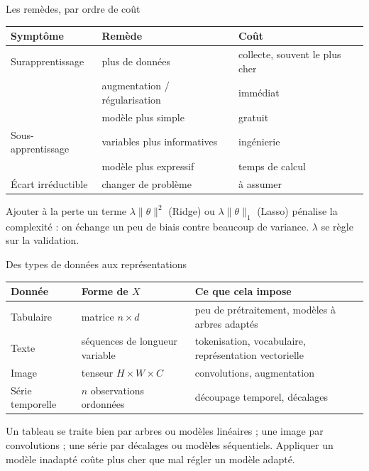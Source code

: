\begin{frame}{Les remèdes, par ordre de coût}
\begin{center}
\small
\begin{tabular}{@{}p{}p{}p{}@{}}
\toprule
\textbf{Symptôme} & \textbf{Remède} & \textbf{Coût} \\
\midrule
Surapprentissage & plus de données & collecte, souvent le plus cher \\
 & augmentation / régularisation & immédiat \\
 & modèle plus simple & gratuit \\
Sous-apprentissage & variables plus informatives & ingénierie \\
 & modèle plus expressif & temps de calcul \\
Écart irréductible & changer de problème & à assumer \\
\bottomrule
\end{tabular}
\end{center}
\vspace{1.5mm}
\begin{kbox}
Ajouter à la perte un terme $\lambda\lVert\theta\rVert^2$ (Ridge) ou
$\lambda\lVert\theta\rVert_1$ (Lasso) pénalise la complexité : on échange un
peu de biais contre beaucoup de variance. $\lambda$ se règle sur la validation.
\end{kbox}
\end{frame}

\begin{frame}{Des types de données aux représentations}
\begin{center}
\small
\begin{tabular}{@{}p{}p{}p{}@{}}
\toprule
\textbf{Donnée} & \textbf{Forme de $X$} & \textbf{Ce que cela impose} \\
\midrule
Tabulaire & matrice $n \times d$ & peu de prétraitement, modèles à arbres
adaptés \\
Texte & séquences de longueur variable & tokenisation, vocabulaire,
représentation vectorielle \\
Image & tenseur $H \times W \times C$ & convolutions, augmentation \\
Série temporelle & $n$ observations ordonnées & découpage temporel, décalages \\
\bottomrule
\end{tabular}
\end{center}
\vspace{1.5mm}
\begin{kbox}
Un tableau se traite bien par arbres ou modèles linéaires ; une image par
convolutions ; une série par décalages ou modèles séquentiels. Appliquer un
modèle inadapté coûte plus cher que mal régler un modèle adapté.
\end{kbox}
\end{frame}

